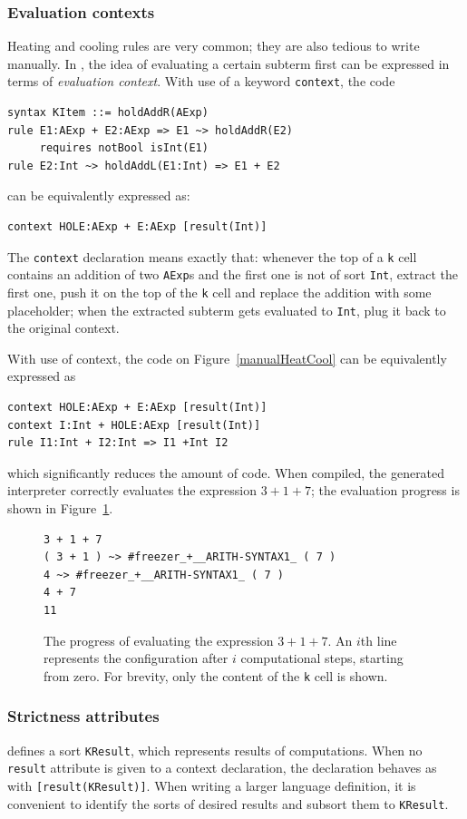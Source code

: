 \documentclass{fithesis3}
\begin{document}
\subsubsection{Evaluation contexts}
Heating and cooling rules are very common; they are also tedious to write manually. In \K, the idea of evaluating a certain subterm first can be expressed in terms of \textit{evaluation context}. With use of a keyword \texttt{context}, the \K code
\begin{lstlisting}
syntax KItem ::= holdAddR(AExp)
rule E1:AExp + E2:AExp => E1 ~> holdAddR(E2)
     requires notBool isInt(E1)
rule E2:Int ~> holdAddL(E1:Int) => E1 + E2
\end{lstlisting}
can be equivalently expressed as:
\begin{lstlisting}
context HOLE:AExp + E:AExp [result(Int)]
\end{lstlisting}
The \texttt{context} declaration means exactly that: whenever the top of a \texttt{k} cell contains an addition of two \texttt{AExp}s and the first one is not of sort \texttt{Int}, extract the first one, push it on the top of the \texttt{k} cell and replace the addition with some placeholder; when the extracted subterm gets evaluated to \texttt{Int}, plug it back to the original context.

With use of context, the code on Figure~\ref{manualHeatCool} can be equivalently expressed as
\begin{lstlisting}
context HOLE:AExp + E:AExp [result(Int)]
context I:Int + HOLE:AExp [result(Int)]
rule I1:Int + I2:Int => I1 +Int I2
\end{lstlisting}
which significantly reduces the amount of code. When compiled, the generated interpreter correctly evaluates the expression $3 + 1 + 7$; the evaluation progress is shown in Figure~\ref{contextEvaluation}.

\begin{figure}
\begin{lstlisting}
3 + 1 + 7
( 3 + 1 ) ~> #freezer_+__ARITH-SYNTAX1_ ( 7 )
4 ~> #freezer_+__ARITH-SYNTAX1_ ( 7 )
4 + 7
11
\end{lstlisting}
\caption{The progress of evaluating the expression $3 + 1 + 7$. An $i$th line represents the configuration after $i$ computational steps, starting from zero. For brevity, only the content of the \texttt{k} cell is shown.}
\label{contextEvaluation}
\end{figure}

\subsubsection{Strictness attributes}
\K defines a sort \texttt{KResult}, which represents results of computations. When no \texttt{result} attribute is given to a context declaration, the declaration behaves as with \lstinline{[result(KResult)]}{}. When writing a larger language definition, it is convenient to identify the sorts of desired results and subsort them to \texttt{KResult}.
\end{document}
